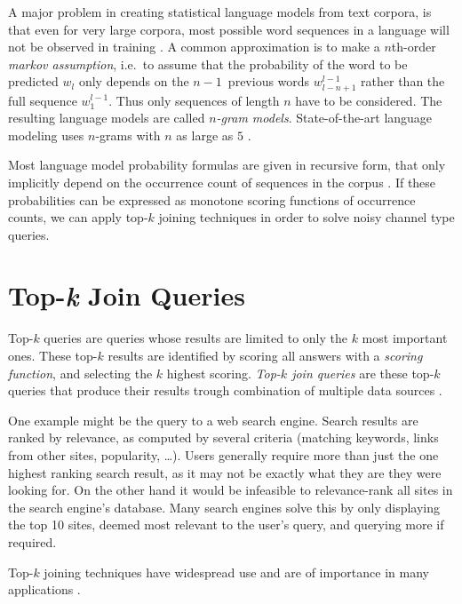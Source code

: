 A major problem in creating statistical language models from text corpora, is
that even for very large corpora, most possible word sequences in a language
will not be observed in training \noref.
A common approximation is to make a $n$th-order \emph{markov assumption},
i.e.\ to assume that the probability of the word to be predicted $w_l$ only
depends on the $n\!-\!1$~previous words $w_{l-n+1}^{l-1}$ rather than the full
sequence $w_1^{l-1}$.
Thus only sequences of length $n$ have to be considered.
The resulting language models are called \emph{$n$-gram models}.
State-of-the-art language modeling uses $n$-grams with $n$ as large as $5$
\parencite{JurafskyMartin2009,Goodman2001,Stolcke2000}.

Most language model probability formulas are given in recursive form, that only
implicitly depend on the occurrence count of sequences in the corpus \noref.
If these probabilities can be expressed as monotone scoring functions of
occurrence counts, we can apply top-$k$ joining techniques in order to solve
noisy channel type queries.


\section{Top-\emph{k} Join Queries}
\label{sec:introduction-topkjoin}

Top-$k$ queries are queries whose results are limited to only the $k$ most
important ones.
These top-$k$ results are identified by scoring all answers with a
\emph{scoring function}, and selecting the $k$ highest scoring.
\emph{Top-$k$ join queries} are these top-$k$ queries that produce
their results trough combination of multiple data sources \parencite{Ilyas2008}.

One example might be the query to a web search engine.
Search results are ranked by relevance, as computed by several criteria
(matching keywords, links from other sites, popularity, \ldots).
Users generally require more than just the one highest ranking search result, as
it may not be exactly what they are they were looking for.
On the other hand it would be infeasible to relevance-rank all sites in the
search engine's database.
Many search engines solve this by only displaying the top 10 sites, deemed most
relevant to the user's query, and querying more if required.

\begin{draft}
Top-$k$ joining techniques have widespread use and are of importance in
many applications \noref.
\end{draft}

